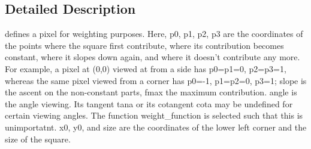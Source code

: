 \subsection{Detailed Description}
defines a pixel for weighting purposes. Here, p0, p1, p2, p3 are the coordinates of the points where the square first contribute, where its contribution becomes constant, where it slopes down again, and where it doesn't contribute any more. For example, a pixel at (0,0) viewed at from a side has p0=p1=0, p2=p3=1, whereas the same pixel viewed from a corner has p0=-\/1, p1=p2=0, p3=1; slope is the ascent on the non-\/constant parts, fmax the maximum contribution. angle is the angle viewing. Its tangent tana or its cotangent cota may be undefined for certain viewing angles. The function weight\_\-function is selected such that this is unimportatnt. x0, y0, and size are the coordinates of the lower left corner and the size of the square. 

